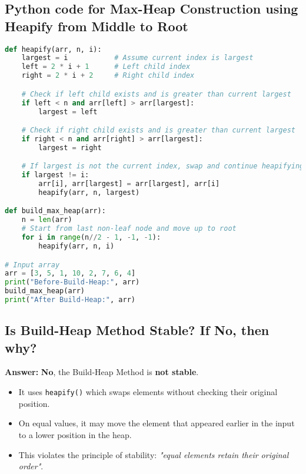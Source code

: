 \documentclass[14pt]{extarticle}
\begin{document}
\subsection*{Python code for Max-Heap Construction using Heapify from Middle to Root}
\begin{lstlisting}[language=Python]
def heapify(arr, n, i):
    largest = i           # Assume current index is largest
    left = 2 * i + 1      # Left child index
    right = 2 * i + 2     # Right child index

    # Check if left child exists and is greater than current largest
    if left < n and arr[left] > arr[largest]:
        largest = left

    # Check if right child exists and is greater than current largest
    if right < n and arr[right] > arr[largest]:
        largest = right

    # If largest is not the current index, swap and continue heapifying
    if largest != i:
        arr[i], arr[largest] = arr[largest], arr[i]
        heapify(arr, n, largest)

def build_max_heap(arr):
    n = len(arr)
    # Start from last non-leaf node and move up to root
    for i in range(n//2 - 1, -1, -1):
        heapify(arr, n, i)

# Input array
arr = [3, 5, 1, 10, 2, 7, 6, 4]
print("Before-Build-Heap:", arr)
build_max_heap(arr)
print("After Build-Heap:", arr)

\end{lstlisting}

\subsection*{Is Build-Heap Method Stable? If No, then why?}

\textbf{Answer:} \textbf{No}, the Build-Heap Method is \textbf{not stable}.

\begin{itemize}
    \item It uses \texttt{heapify()} which swaps elements without checking their original position.
    \item On equal values, it may move the element that appeared earlier in the input to a lower position in the heap.
    \item This violates the principle of stability: \textit{"equal elements retain their original order"}.
\end{itemize}


\vspace{1em}
\end{document}
